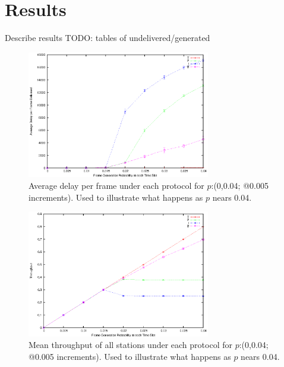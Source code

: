 \documentclass[twocolumn]{article}
\begin{document}



\section*{Results}

Describe results TODO: tables of undelivered/generated


\begin{figure}
    \centering \includegraphics[width=8cm]{plots/delay_big.eps}
    \caption{\footnotesize  Average delay per frame under each protocol for
    $p$:(0,0.04; @0.005 increments). Used to illustrate what happens as $p$
    nears 0.04.} \label{fig:delay_big}
\end{figure}

\begin{figure}
    \centering \includegraphics[width=8cm]{plots/throughput_big.eps}
    \caption{\footnotesize Mean throughput of all stations under each protocol
    for $p$:(0,0.04; @0.005 increments). Used to illustrate what happens as $p$
    nears 0.04.} \label{fig:throughput_big}
\end{figure}
\end{document}
